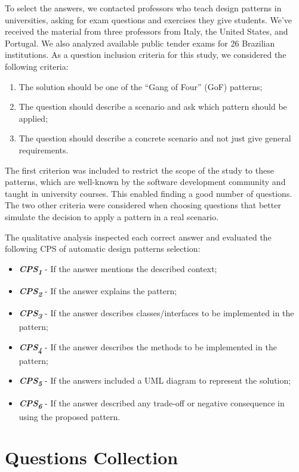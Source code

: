 To select the answers, we contacted professors who teach design patterns in universities, asking for exam questions and exercises they give students. We've received the material from three professors from Italy, the United States, and Portugal. We also analyzed available public tender exams for 26 Brazilian institutions. As a question inclusion criteria for this study, we considered the following criteria: 
\begin{enumerate}
    \item The solution should be one of the “Gang of Four” (GoF) patterns; 
    \item The question should describe a scenario and ask which pattern should be applied;
    \item The question should describe a concrete scenario and not just give general requirements. 
\end{enumerate}
The first criterion was included to restrict the scope of the study to these patterns, which are well-known by the software development community and taught in university courses. This enabled finding a good number of questions. The two other criteria were considered when choosing questions that better simulate the decision to apply a pattern in a real scenario.

The qualitative analysis inspected each correct answer and evaluated the following \ac{CPS} of automatic design patterns selection: 
\begin{itemize}
\item \textbf{\textit{CPS\textsubscript{1}}} - If the answer mentions the described context;
\item \textbf{\textit{CPS\textsubscript{2}}} - If the answer explains the pattern;
\item \textbf{\textit{CPS\textsubscript{3}}} - If the answer describes classes/interfaces to be implemented in the pattern; 
\item \textbf{\textit{CPS\textsubscript{4}}} - If the answer describes the methods to be implemented in the pattern; 
\item \textbf{\textit{CPS\textsubscript{5}}} - If the answers included a UML diagram to represent the solution; 
\item \textbf{\textit{CPS\textsubscript{6}}} - If the answer described any trade-off or negative consequence in using the proposed pattern.
\end{itemize}

\section{Questions Collection}\label{QuestionDatabasePreliminaryStudy}

